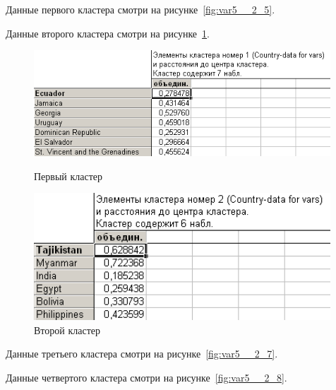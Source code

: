 Данные первого кластера смотри на рисунке~\ref{fig:var5__2_5}.

Данные второго кластера смотри на рисунке~\ref{fig:var5__2_6}.

\begin{figure}[!h]
  \centering
  \begin{minipage}{0.49\textwidth}
    \centering

    \includegraphics[width=0.99\textwidth]
    {inc/cars_my/var5__2_5.PNG}

    \caption{Первый кластер}
    \label{fig:var5__2_5}
  \end{minipage}
  \begin{minipage}{0.49\textwidth}
    \centering

    \includegraphics[width=0.99\textwidth]
    {inc/cars_my/var5__2_6.PNG}

    \caption{Второй кластер}
    \label{fig:var5__2_6}
  \end{minipage}
\end{figure}

Данные третьего кластера смотри на рисунке~\ref{fig:var5__2_7}.

Данные четвертого кластера смотри на рисунке~\ref{fig:var5__2_8}.

